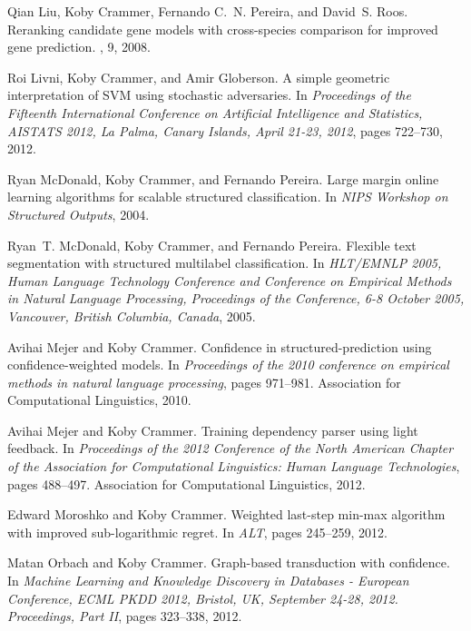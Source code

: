 \documentclass[12pt]{article}
\begin{document}
\begin{small}
\begin{thebibliography}{10}
Qian Liu, Koby Crammer, Fernando C.~N. Pereira, and David~S. Roos.
\newblock Reranking candidate gene models with cross-species comparison for
improved gene prediction.
, 9, 2008.

Roi Livni, Koby Crammer, and Amir Globerson.
\newblock A simple geometric interpretation of {SVM} using stochastic
adversaries.
\newblock In {\em Proceedings of the Fifteenth International Conference on
	Artificial Intelligence and Statistics, {AISTATS} 2012, La Palma, Canary
	Islands, April 21-23, 2012}, pages 722--730, 2012.

Ryan McDonald, Koby Crammer, and Fernando Pereira.
\newblock Large margin online learning algorithms for scalable structured
classification.
\newblock In {\em NIPS Workshop on Structured Outputs}, 2004.

Ryan~T. McDonald, Koby Crammer, and Fernando Pereira.
\newblock Flexible text segmentation with structured multilabel classification.
\newblock In {\em {HLT/EMNLP} 2005, Human Language Technology Conference and
	Conference on Empirical Methods in Natural Language Processing, Proceedings
	of the Conference, 6-8 October 2005, Vancouver, British Columbia, Canada},
2005.

Avihai Mejer and Koby Crammer.
\newblock Confidence in structured-prediction using confidence-weighted models.
\newblock In {\em Proceedings of the 2010 conference on empirical methods in
	natural language processing}, pages 971--981. Association for Computational
Linguistics, 2010.

Avihai Mejer and Koby Crammer.
\newblock Training dependency parser using light feedback.
\newblock In {\em Proceedings of the 2012 Conference of the North American
	Chapter of the Association for Computational Linguistics: Human Language
	Technologies}, pages 488--497. Association for Computational Linguistics,
2012.

Edward Moroshko and Koby Crammer.
\newblock Weighted last-step min-max algorithm with improved sub-logarithmic
regret.
\newblock In {\em ALT}, pages 245--259, 2012.

Matan Orbach and Koby Crammer.
\newblock Graph-based transduction with confidence.
\newblock In {\em Machine Learning and Knowledge Discovery in Databases -
	European Conference, {ECML} {PKDD} 2012, Bristol, UK, September 24-28, 2012.
	Proceedings, Part {II}}, pages 323--338, 2012.


\end{thebibliography}
\end{small}
\end{document}
